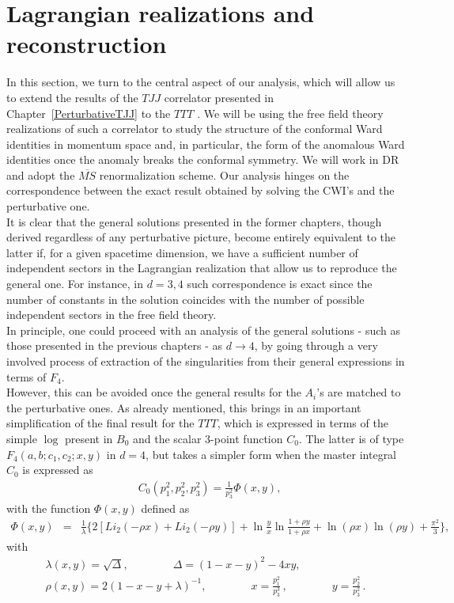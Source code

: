 \documentclass[a4paper,11pt,openright,twoside]{book}
\newcommand{\chapref}[1]{Chapter~\ref{#1}}		%
\numberwithin{equation}{section}
\begin{document}
{{\section{Lagrangian realizations and reconstruction}
In this section, we turn to the central aspect of our analysis, which will allow us to extend the results of the $TJJ$ correlator presented in \chapref{PerturbativeTJJ} to the $TTT$ \cite{Coriano:2018bbe}. We will be using the free field theory realizations of such a correlator to study the structure of the conformal Ward identities in momentum space and, in particular, the form of the anomalous Ward identities once the anomaly breaks the conformal symmetry. We will work in DR and adopt the $\overline{MS}$ renormalization scheme. Our analysis hinges on the correspondence between the exact result obtained by solving the CWI's and the perturbative one. \\
It is clear that the general solutions presented in the former chapters, though derived regardless of any perturbative picture, become entirely equivalent to the latter if, for a given spacetime dimension, we have a sufficient number of independent sectors in the Lagrangian realization that allow us to reproduce the general one. For instance, in $d=3,4$ such correspondence is exact since the number of constants in the solution coincides with the number of possible independent sectors in the free field theory.\\
In principle, one could proceed with an analysis of the general solutions - such as those presented in the previous chapters - as $d\to 4$, by going through a very involved process of extraction of the singularities from their general expressions in terms of $F_4$.\\
However, this can be avoided once the general results for the $A_i$'s are matched to the perturbative ones. As already mentioned, this brings in an important simplification of the final result for the $TTT$, which is expressed in terms of the simple $\log$ present in $B_0$ and the scalar 3-point function $C_0$. The latter is of type $F_4(a,b;c_1,c_2;x,y)$ in $d=4$, but takes a simpler form when the master integral $C_0$ is expressed as
\begin{align}
	&  C_0 ( p_1^2,p_2^2,p_3^2) = \frac{ 1}{p_3^2} \Phi (x,y),
\end{align}
%
with the function $\Phi (x, y)$ defined as
\cite{Usyukina:1993ch}
\begin{align}
	\Phi( x, y) &=& \frac{1}{\lambda} \biggl\{ 2 [Li_2(-\rho  x) + Li_2(- \rho y)]  +
	\ln \frac{y}{ x}\ln \frac{1+ \rho y }{1 + \rho x}+ \ln (\rho x) \ln (\rho  y) + \frac{\pi^2}{3} \biggr\},
	\label{Phi}
\end{align}
with
\begin{align}
	\lambda(x,y) = \sqrt {\Delta},
	\qquad  \qquad \Delta=(1-  x- y)^2 - 4  x  y,
	\label{lambda} \\
	\rho( x,y) = 2 (1-  x-  y+\lambda)^{-1},
	\qquad  \qquad x=\frac{p_1^2}{p_3^3} \, ,\qquad \qquad y= \frac {p_2^2}{p_3^2}\, .
\end{align}

}}
\end{document}
